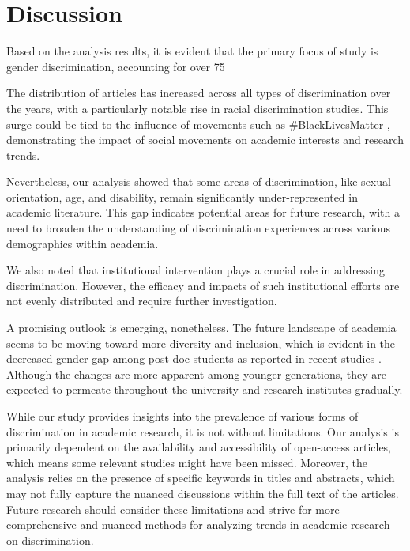\documentclass[runningheads]{llncs}
\begin{document}
\section{Discussion}
Based on the analysis results, it is evident that the primary focus of study is gender discrimination, accounting for over 75%

The distribution of articles has increased across all types of discrimination over the years, with a particularly notable rise in racial discrimination studies. This surge could be tied to the influence of movements such as \#BlackLivesMatter \cite{nguyen2022black}, demonstrating the impact of social movements on academic interests and research trends.

Nevertheless, our analysis showed that some areas of discrimination, like sexual orientation, age, and disability, remain significantly under-represented in academic literature. This gap indicates potential areas for future research, with a need to broaden the understanding of discrimination experiences across various demographics within academia.

We also noted that institutional intervention plays a crucial role in addressing discrimination. However, the efficacy and impacts of such institutional efforts are not evenly distributed and require further investigation.

A promising outlook is emerging, nonetheless. The future landscape of academia seems to be moving toward more diversity and inclusion, which is evident in the decreased gender gap among post-doc students as reported in recent studies \cite{https://doi.org/10.1111/gwao.12549}. Although the changes are more apparent among younger generations, they are expected to permeate throughout the university and research institutes gradually.

While our study provides insights into the prevalence of various forms of discrimination in academic research, it is not without limitations. Our analysis is primarily dependent on the availability and accessibility of open-access articles, which means some relevant studies might have been missed. Moreover, the analysis relies on the presence of specific keywords in titles and abstracts, which may not fully capture the nuanced discussions within the full text of the articles. Future research should consider these limitations and strive for more comprehensive and nuanced methods for analyzing trends in academic research on discrimination.


\nocite{*}

\end{document}
